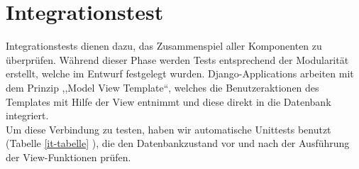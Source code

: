 \documentclass[parskip=full,11pt]{scrartcl}
\begin{document}
\begin{longtable}[c]{|p{0.4cm}|P{2.5cm}|p{3.5cm}|p{5cm}|p{3cm}|}
                  
\end{longtable}
\newpage


\section{Integrationstest} \label{integrationtest}
Integrationstests dienen dazu, das Zusammenspiel aller Komponenten zu überprüfen. Während dieser Phase werden Tests entsprechend der Modularität erstellt, welche im Entwurf festgelegt wurden. Django-Applications arbeiten mit dem Prinzip ,,Model View Template``, welches die Benutzeraktionen des Templates mit Hilfe der View entnimmt und diese direkt in die Datenbank integriert.\\
Um diese Verbindung zu testen, haben wir automatische Unittests benutzt (Tabelle \ref{it-tabelle} ), die den Datenbankzustand vor und nach der Ausführung der View-Funktionen prüfen.\\
\end{document}
